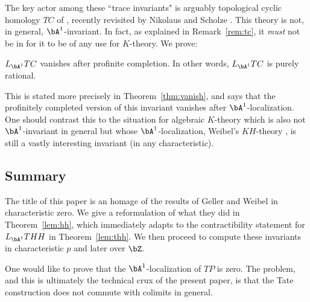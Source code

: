 \documentclass[a4paper,10pt]{amsart}
\begin{document}
The key actor among these ``trace invariants" is arguably topological cyclic homology $TC$ of \cite{bhm}, recently revisited by Nikolaus and Scholze \cite{nikolaus-scholze}. This theory is not, in general, $\bA^1$-invariant. In fact, as explained in Remark~\ref{rem:tc}, it \emph{must} not be in for it to be of any use for $K$-theory. We prove:
\begin{thm} $L_{\bA^1}TC$ vanishes after profinite completion. In other words, $L_{\bA^1}TC$ is purely rational.
\end{thm}
This is stated more precisely in Theorem~\ref{thm:vanish}, and says that the profinitely completed version of this invariant vanishes after $\bA^1$-localization. One should contrast this to the situation for algebraic $K$-theory which is also not $\bA^1$-invariant in general but whose $\bA^1$-localization, Weibel's $KH$-theory \cite{Weibel}, is still a vastly interesting invariant (in any characteristic).

\subsection{Summary} The title of this paper is an homage of the results of Geller and Weibel \cite{geller-weibel} in characteristic zero. We give a reformulation of what they did in Theorem~\ref{lem:hh}, which immediately adapts to the contractibility statement for $L_{\bA^1}THH$ in Theorem~\ref{lem:thh}. We then proceed to compute these invariants in characteristic $p$ and later over $\bZ$.

One would like to prove that the $\bA^1$-localization of $TP$ is zero. The problem, and this is ultimately the technical crux of the present paper, is that the Tate construction does not commute with colimits in general.

\end{document}
